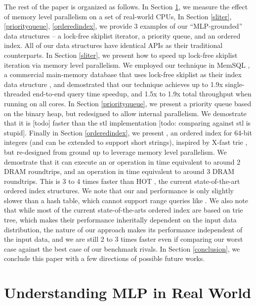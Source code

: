 \documentclass[11pt, usletter]{article}
\begin{document}
The rest of the paper is organized as follows. 
In Section \ref{understandmlp}, we measure the effect of memory level parallelism on a set of real-world CPUs, 
In Section \ref{sliter}, \ref{priorityqueue}, \ref{orderedindex}, 
we provide 3 examples of our ``MLP-grounded'' data structures -- a lock-free skiplist iterator, 
a priority queue, and an ordered index. All of our data structures have identical APIs as their traditional counterparts.
In Section \ref{sliter}, we present how to speed up lock-free skiplist iteration via memory level parallelism. 
We employed our technique in MemSQL \cite{memsql},
a commercial main-memory database that uses lock-free skiplist as their index data structure \cite{memsqladamblog}, 
and demostrated that our technique achieves up to 1.9x single-threaded end-to-end query time speedup, and 1.5x to 1.9x
total throughput when running on all cores.
In Section \ref{priorityqueue}, we present a priority queue based on the binary heap, 
but redesigned to allow internal parallelism. We demostrate that it is [todo] faster than the stl implementation 
[todo: comparing against stl is stupid]. 
Finally in Section \ref{orderedindex}, we present \MlpIndex, an ordered index for 64-bit integers 
(and can be extended to support short strings), 
inspired by X-fast trie \cite{xfast}, but re-designed from ground up to leverage memory level parallelism. 
We demostrate that it can execute an \insertion or \lookup operation in time equivalent to around 2 DRAM roundtrips, 
and an \lowerbound operation in time equivalent to around 3 DRAM roundtrips. 
This is 3 to 4 times faster than HOT \cite{hot_sigmod18}, the current state-of-the-art ordered index structures. 
We note that our \insertion and \lookup performance is only slightly slower than a hash table, 
which cannot support range queries like \lowerbound.
We also note that while most of the current state-of-the-arts ordered index are based on trie tree, 
which makes their performance inheritally dependent on the input data distribution, 
the nature of our approach makes its performance independent of the input data, 
and we are still 2 to 3 times faster even if comparing our worst case against the best case of our benchmark rivals.
In Section \ref{conclusion}, we conclude this paper with a few directions of possible future works.

\section{Understanding MLP in Real World} \label{understandmlp}
\end{document}
